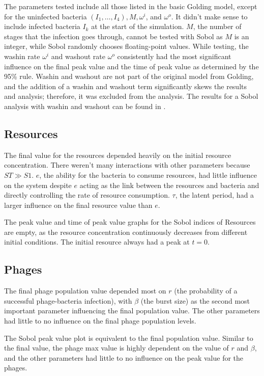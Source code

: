 The parameters tested include all those listed in the basic Golding model, except for the uninfected bacteria $(I_1, \dots, I_4), M, \omega^i$, and $\omega^o$. 
It didn't make sense to include infected bacteria $I_k$ at the start of the simulation. 
$M$, the number of stages that the infection goes through, cannot be tested with Sobol as $M$ is an integer, while Sobol randomly chooses floating-point values. 
While testing, the washin rate $\omega^i$ and washout rate $\omega^o$ consistently had the most significant influence on the final peak value and the time of peak value as determined by the 95\% rule. 
Washin and washout are not part of the original model from Golding, and the addition of a washin and washout term significantly skews the results and analysis; therefore, it was excluded from the analysis. 
The results for a Sobol analysis with washin and washout can be found in . 

\subsection{Resources}
The final value for the resources depended heavily on the initial resource concentration. 
There weren't many interactions with other parameters because $ST \gg S1$. 
$e$, the ability for the bacteria to consume resources, had little influence on the system despite $e$ acting as the link between the resources and bacteria and directly controlling the rate of resource consumption. 
$\tau$, the latent period, had a larger influence on the final resource value than $e$. 

The peak value and time of peak value graphs for the Sobol indices of Resources are empty, as the resource concentration continuously decreases from different initial conditions. 
The initial resource always had a peak at $t=0$. 

\subsection{Phages}
The final phage population value depended most on $r$ (the probability of a successful phage-bacteria infection), with $\beta$ (the burst size) as the second most important parameter influencing the final population value. 
The other parameters had little to no influence on the final phage population levels. 

The Sobol peak value plot is equivalent to the final population value. 
Similar to the final value, the phage max value is highly dependent on the value of $r$ and $\beta$, and the other parameters had little to no influence on the peak value for the phages. 


